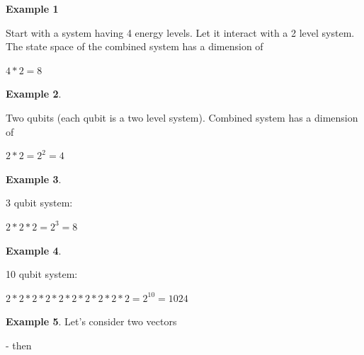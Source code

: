 \documentclass{article}
\begin{document}
\textbf{Example 1}

Start with a system having 4 energy levels. Let it interact with a 2 level system. The state space of the combined system has a dimension of

$4 * 2 = 8$ 


\textbf{Example 2}.

Two qubits (each qubit is a two level system).
Combined system has a dimension of 

$2*2 = 2^2 = 4$

\textbf{Example 3}.

3 qubit system:

$2*2*2 = 2^3 = 8$ 

\textbf{Example 4}.

10 qubit system:

$2*2*2*2*2*2*2*2*2*2 = 2^{10} = 1024$



\textbf{Example 5}. Let's consider two vectors

- then

\end{document}
